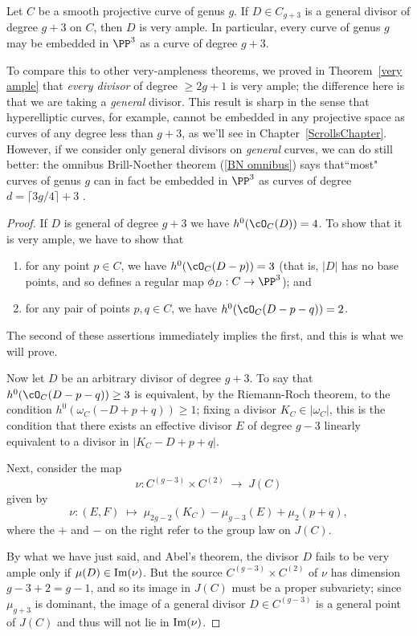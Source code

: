 \begin{theorem}\label{g+3 theorem}
Let $C$ be a smooth projective curve of genus $g$. If $D \in C_{g+3}$ is a general divisor of degree $g+3$ on $C$, then 
$D$ is very ample. In particular, every curve of genus $g$ may be embedded in $\PP^{3}$ as a curve of degree $g+3$.
\end{theorem}

To compare this to other very-ampleness theorems, we proved in Theorem~\ref{very ample} that \emph{every divisor} of degree $\geq 2g+1$ is very ample; the difference here is that we are taking a \emph{general} divisor. This result is sharp in the sense that hyperelliptic curves, for example, cannot be embedded in any projective space as curves of any degree less than $g+3$, as we'll see in Chapter~\ref{ScrollsChapter}. However, if we consider only general divisors on \emph{general} curves, we can do still better: the omnibus Brill-Noether theorem (\ref{BN omnibus}) says that``most" curves of genus $g$ can in fact be embedded in $\PP^{3}$ as curves of degree $d = \lceil 3g/4 \rceil + 3$ \cite{}.

\begin{proof}
If $D$ is general of degree $g+3$ we have $h^0(\cO_C(D)) = 4$. To show that it is very ample, we have to show that
\begin{enumerate}
\item for any point $p \in C$, we have $h^0(\cO_C(D-p)) = 3$ (that is, $|D|$ has no base points, and so defines a regular map $\phi_D : C \to \PP^3$); and
\item for any pair of points $p, q \in C$, we have $h^0(\cO_C(D-p-q)) = 2$.
\end{enumerate}
The second of these assertions immediately implies the first, and this is what we will prove.

Now let $D$ be an arbitrary divisor of degree $g+3$. To say that $h^0(\cO_C(D-p-q)) \geq 3$ is equivalent, by the Riemann-Roch theorem, to the condition $h^0(\omega_C(-D + p + q)) \geq 1$; fixing a divisor 
$K_{C}\in |\omega_{C}|$, this is the condition that there exists  
an effective divisor $E$ of degree $g-3$ linearly equivalent to a divisor in $|K_C - D + p + q|$. 

Next, consider the map 
$$
\nu : C^{(g-3)} \times C^{(2)} \; \to \; J(C)
$$
given by
$$
\nu : (E,F) \; \mapsto \; \mu_{2g-2}(K_C) - \mu_{g-3}(E) + \mu_{2}(p+q), 
$$
where the $+$ and $-$ on the right refer to the group law on $J(C)$. 

By what we have just said, and Abel's theorem, the divisor $D$ fails to be very ample only if
$\mu(D) \in {\rm Im}(\nu)$. But the source $C^{(g-3)} \times C^{(2)}$ of $\nu$ has dimension $g-3+2 = g-1$, and so its image in $J(C)$ must be a proper subvariety; since $\mu_{g+3}$ is dominant, the image of a general divisor $D \in C^{(g-3)}$ is a general point of $J(C)$ and thus will not lie in ${\rm Im}(\nu)$. 
\end{proof}

